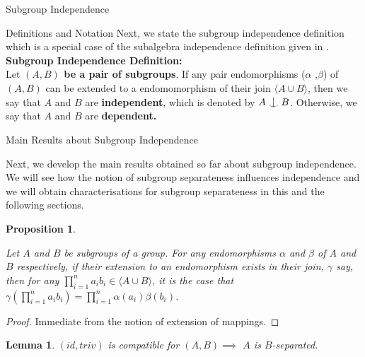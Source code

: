 \documentclass{article}
\newtheorem{proposition}{Proposition}[section]
\newtheorem{lemma}{Lemma}[section]
\def\indep{\mathrel{\raise0.2ex\hbox{\ooalign{\hidewidth$\vert$\hidewidth\cr\raise-0.9ex\hbox{$\smile$}}}}}
\begin{document}
\begin{section}{Subgroup Independence}
\begin{subsection}{\large Definitions and Notation}
			\noindent	Next, we state the subgroup independence definition which is a special case of the subalgebra independence definition given in \cite{Z1}.\\
			
			
			
			{\large\noindent\textbf{Subgroup Independence Definition:} }\\
			
			\noindent Let \textbf{$(A, B)$ be a pair of subgroups}. If any pair endomorphisms ($\alpha$ ,$\beta$) of $(A, B)$ can be extended to a endomomorphism of their join $\langle A \cup B\rangle $, then we say that $A$ and $B$ are \textbf{independent}, which is denoted by $A \indep B$. Otherwise, we say that $A$ and $B$ are \textbf{dependent.} 
			
			
		\end{subsection}
		
		\begin{subsection}{Main Results about Subgroup Independence}
			
			Next, we develop the main results obtained so far about subgroup independence. We will see  how the notion of subgroup separateness influences independence and we will obtain characterisations for subgroup separateness in this and the following sections.
			
			\begin{proposition}\label{P2.1}
				
				Let $A$ and $B$ be subgroups of a group. For any endomorphisms $\alpha$ and $\beta$ of $A$ and $B$ respectively, if their extension to an endomorphism exists in their join,   $\gamma$ say, then for any $\prod_{i= 1}^{n}a_ib_i \in \langle A \cup B\rangle $, it is the case that $ \gamma(\prod_{i=1}^{n}a_ib_i) =\prod_{i=1}^{n} \alpha(a_i)\beta(b_i)$.\\
			\end{proposition}
			
			\begin{proof}
				Immediate from the notion of extension of mappings.
			\end{proof}
			
			
			
			\begin{lemma}\label{L2.1}
				$(id, triv)$ is compatible for $(A, B) \implies$ $A$
				is $B$-separated.
			\end{lemma}
			

\end{subsection}
\end{section}
\end{document}
